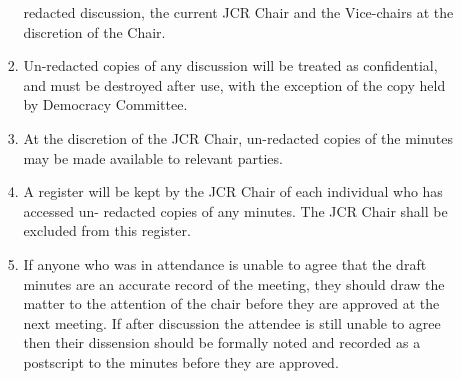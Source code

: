 \begin{enumerate}
\begin{enumerate}
\begin{enumerate}
            redacted discussion, the current JCR Chair and the Vice-chairs at the discretion of the Chair.
            \item Un-redacted copies of any discussion will be treated as confidential, and must be destroyed after use, with the exception of the copy held by Democracy Committee.
            \item At the discretion of the JCR Chair, un-redacted copies of the minutes may be made available to relevant parties.
            \item A register will be kept by the JCR Chair of each individual who has accessed un- redacted copies of any minutes. The JCR Chair shall be excluded from this register.
            \item If anyone who was in attendance is unable to agree that the draft minutes are an accurate record of the meeting, they should draw the matter to the attention of the chair before they are approved at the next meeting. If after discussion the attendee is still unable to agree then their dissension should be formally noted and recorded as a postscript to the minutes before they are approved.
        \end{enumerate}
    \end{enumerate}
\end{enumerate}

